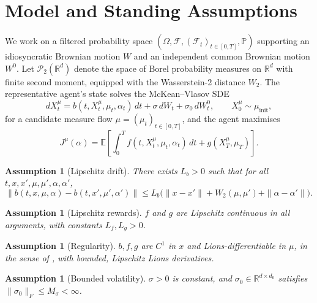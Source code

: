 \documentclass[11pt]{article}
\newtheorem{assumption}[theorem]{Assumption}
\theoremstyle{remark}
\begin{document}
\section{Model and Standing Assumptions}
\label{sec:setup}

We work on a filtered probability space
$(\Omega, \mathcal{F}, (\mathcal{F}_t)_{t\in[0,T]}, \mathbb{P})$ supporting an
idiosyncratic Brownian motion $W$ and an independent common Brownian motion $W^0$.
Let $\mathcal{P}_2(\mathbb{R}^d)$ denote the space of Borel probability measures on
$\mathbb{R}^d$ with finite second moment, equipped with the Wasserstein-2 distance
$W_2$. The representative agent's state solves the McKean--Vlasov SDE
\begin{equation}
    dX_t^\mu = b(t, X_t^\mu, \mu_t, \alpha_t)\, dt + \sigma\, dW_t + \sigma_0\, dW_t^0,
    \qquad X_0^\mu \sim \mu_{\mathrm{init}},
    \label{eq:agent-sde}
\end{equation}
for a candidate measure flow $\mu = (\mu_t)_{t\in[0,T]}$, and the agent maximises
\begin{equation}
    J^\mu(\alpha) = \mathbb{E}\left[\int_0^T f(t, X_t^\mu, \mu_t, \alpha_t)\, dt +
    g(X_T^\mu, \mu_T)\right].
    \label{eq:objective}
\end{equation}

\begin{assumption}[Lipschitz drift]
\label{ass:lipschitz-drift}
There exists $L_b > 0$ such that for all $t, x, x', \mu, \mu', \alpha, \alpha'$,
\[
    \|b(t,x,\mu,\alpha) - b(t,x',\mu',\alpha')\| \le L_b\big(\|x-x'\| + W_2(\mu,\mu') +
    \|\alpha-\alpha'\|\big).
\]
\end{assumption}

\begin{assumption}[Lipschitz rewards]
\label{ass:lipschitz-rewards}
$f$ and $g$ are Lipschitz continuous in all arguments, with constants $L_f, L_g > 0$.
\end{assumption}

\begin{assumption}[Regularity]
\label{ass:regularity}
$b, f, g$ are $C^1$ in $x$ and Lions-differentiable in $\mu$, in the sense of
\citet[Ch.~5]{carmonadelarue2018}, with bounded, Lipschitz Lions derivatives.
\end{assumption}

\begin{assumption}[Bounded volatility]
\label{ass:volatility}
$\sigma > 0$ is constant, and $\sigma_0 \in \mathbb{R}^{d\times d_0}$ satisfies
$\|\sigma_0\|_F \le M_\sigma < \infty$.
\end{assumption}
\end{document}
